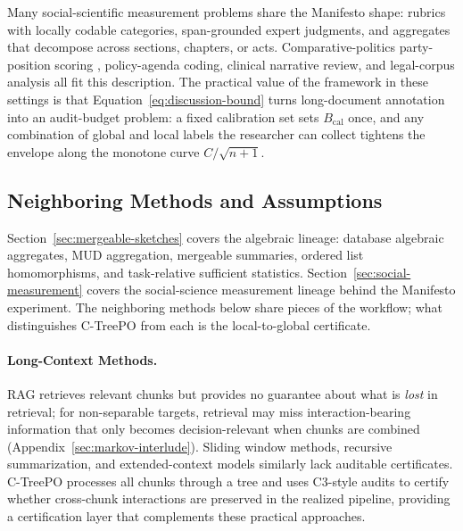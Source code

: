 Many social-scientific measurement problems share the Manifesto
shape: rubrics with locally codable categories, span-grounded
expert judgments, and aggregates that decompose across sections,
chapters, or acts. Comparative-politics party-position scoring
\citep{BenoitEtAl2025,ManifestoProject2025a}, policy-agenda coding,
clinical narrative review, and legal-corpus analysis all fit this
description. The practical value of the framework in these settings
is that Equation~\eqref{eq:discussion-bound} turns long-document
annotation into an audit-budget problem: a fixed calibration set
sets $B_{\mathrm{cal}}$ once, and any combination of global and
local labels the researcher can collect tightens the envelope along
the monotone curve $C/\sqrt{n+1}$.
\subsection{Neighboring Methods and Assumptions}\label{sec:related}

Section~\ref{sec:mergeable-sketches} covers the algebraic lineage:
database algebraic aggregates, MUD aggregation, mergeable summaries,
ordered list homomorphisms, and task-relative sufficient statistics.
Section~\ref{sec:social-measurement} covers the social-science
measurement lineage behind the Manifesto experiment. The neighboring
methods below share pieces of the workflow; what distinguishes C-TreePO
from each is the local-to-global certificate.

\paragraph{Long-Context Methods.}
RAG retrieves relevant chunks but provides no guarantee about what is
\emph{lost} in retrieval; for non-separable targets, retrieval may miss
interaction-bearing information that only becomes decision-relevant when
chunks are combined (Appendix~\ref{sec:markov-interlude}). Sliding window
methods, recursive summarization, and extended-context models similarly
lack auditable certificates. C-TreePO processes all chunks through a tree
and uses C3-style audits to certify whether cross-chunk interactions are
preserved in the realized pipeline, providing a certification layer that
complements these practical approaches.

